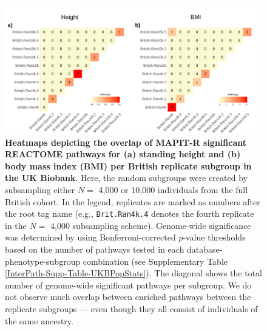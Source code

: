 \documentclass[10pt]{article}
\begin{document}
\begin{landscape}
\begin{figure}[htbp]
\centering
\includegraphics[scale=.2]{Images/Supp/InterPath_Supp_Figure_BritReps_Heatplots_REACTOME_vs4.png}
\caption{\textbf{Heatmaps depicting the overlap of MAPIT-R significant REACTOME pathways for (a) standing height and (b) body mass index (BMI) per British replicate subgroup in the UK Biobank}. Here, the random subgroups were created by subsampling either $N =$ 4,000 or 10,000 individuals from the full British cohort. In the legend, replicates are marked as numbers after the root tag name (e.g., \texttt{Brit.Ran4k.4} denotes the fourth replicate in the $N =$ 4,000 subsampling scheme). Genome-wide significance was determined by using Bonferroni-corrected $p$-value thresholds based on the number of pathways tested in each database-phenotype-subgroup combination (see Supplementary Table \ref{InterPath-Supp-Table-UKBPopStats}). The diagonal shows the total number of genome-wide significant pathways per subgroup. We do not observe much overlap between enriched pathways between the replicate subgroups --- even though they all consist of individuals of the same ancestry.}
\label{InterPath-Supp-Figure-BritReps-Heatplots-AllPaths-REACTOME}
\end{figure}
\clearpage
\end{landscape}
\end{document}
